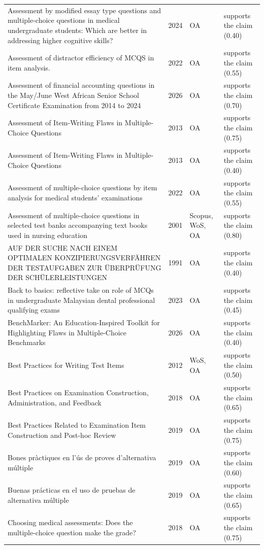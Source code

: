 \begin{longtable}{@{}%
  >{\raggedright\arraybackslash}p{}c%
  >{\raggedright\arraybackslash}p{}%
  >{\raggedright\arraybackslash}p{}@{}}
Assessment by modified essay type questions and multiple-choice questions in medical undergraduate students: Which are better in addressing higher cognitive skills? & 2024 & OA & supports the claim (0.40) \\
Assessment of distractor efficiency of MCQS in item analysis. & 2022 & OA & supports the claim (0.55) \\
Assessment of financial accounting questions in the May/June West African Senior School Certificate Examination from 2014 to 2024 & 2026 & OA & supports the claim (0.70) \\
Assessment of Item-Writing Flaws in Multiple-Choice Questions & 2013 & OA & supports the claim (0.75) \\
Assessment of Item-Writing Flaws in Multiple-Choice Questions & 2013 & OA & supports the claim (0.40) \\
Assessment of multiple-choice questions by item analysis for medical students' examinations & 2022 & OA & supports the claim (0.55) \\
Assessment of multiple-choice questions in selected test banks accompanying text books used in nursing education & 2001 & Scopus, WoS, OA & supports the claim (0.80) \\
AUF DER SUCHE NACH EINEM OPTIMALEN KONZIPIERUNGSVERFÄHREN DER TESTAUFGABEN ZUR ÜBERPRÜFUNG DER SCHÜLERLEISTUNGEN & 1991 & OA & supports the claim (0.40) \\
Back to basics: reflective take on role of MCQs in undergraduate Malaysian dental professional qualifying exams & 2023 & OA & supports the claim (0.45) \\
BenchMarker: An Education-Inspired Toolkit for Highlighting Flaws in Multiple-Choice Benchmarks & 2026 & OA & supports the claim (0.40) \\
Best Practices for Writing Test Items & 2012 & WoS, OA & supports the claim (0.50) \\
Best Practices on Examination Construction, Administration, and Feedback & 2018 & OA & supports the claim (0.65) \\
Best Practices Related to Examination Item Construction and Post-hoc Review & 2019 & OA & supports the claim (0.75) \\
Bones pràctiques en l'ús de proves d'alternativa múltiple & 2019 & OA & supports the claim (0.60) \\
Buenas prácticas en el uso de pruebas de alternativa múltiple & 2019 & OA & supports the claim (0.65) \\
Choosing medical assessments: Does the multiple-choice question make the grade? & 2018 & OA & supports the claim (0.75) \\

\end{longtable}
